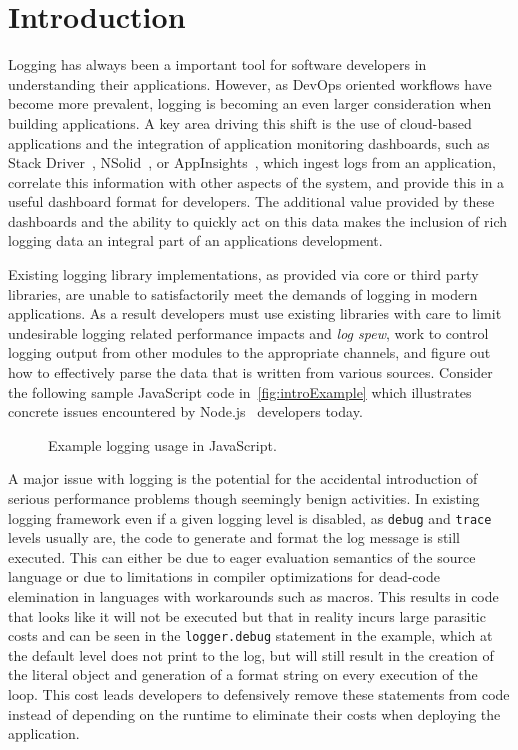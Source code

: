 \documentclass[sigplan,10pt,review]{acmart}
\begin{document}
\section{Introduction} 
\label{sec:intro}
Logging has always been a important tool for software developers in
understanding their applications. However, as DevOps oriented workflows have
become more prevalent, logging is becoming an even larger consideration when
building applications. A key area driving this shift is the use of cloud-based
applications and the integration of application monitoring dashboards, such as
Stack Driver~\cite{StackDriver}, NSolid~\cite{NSolid}, or
AppInsights~\cite{AppInsights}, which ingest logs from an application, correlate
this information with other aspects of the system, and provide this in a useful
dashboard format for developers. The additional value provided by these
dashboards and the ability to quickly act on this data makes the inclusion of
rich logging data an integral part of an applications development.

Existing logging library implementations, as provided via core or third party
libraries, are unable to satisfactorily meet the demands of logging in modern
applications. As a result developers must use existing libraries with care to
limit undesirable logging related performance impacts and \emph{log spew}, work 
to control logging output from other modules to the appropriate channels, and figure
out how to effectively parse the data that is written from various sources.
Consider the following sample JavaScript code in~\autoref{fig:introExample} 
which illustrates concrete issues encountered by Node.js~\cite{Node} developers today.

\begin{figure*}[t]

\caption{Example logging usage in JavaScript.}
\label{fig:introExample}
\end{figure*}

A major issue with logging is the potential for the accidental introduction 
of serious performance problems though seemingly benign activities. In 
existing logging framework even if a given logging level is disabled, 
as \texttt{debug} and \texttt{trace} levels usually are, the code to generate 
and format the log message is still executed. This can either be due to eager 
evaluation semantics of the source language or due to limitations in compiler 
optimizations for dead-code elemination in languages with workarounds such as 
macros. This results in code that looks like it will not be executed but that in 
reality incurs large parasitic costs and can be seen in the \texttt{logger.debug} 
statement in the example, which at the default level does not print to the log, but will
still result in the creation of the literal object and generation of a format
string on every execution of the loop. This cost leads developers to defensively
remove these statements from code instead of depending on the runtime to
eliminate their costs when deploying the application.
\end{document}
